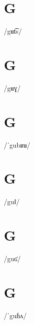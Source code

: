 \documentclass[10pt,a4paper,twoside]{book}
\begin{document}
\section*{G}

\begin{multicols}{3}
 {/gʉt͡s/} {}
\end{multicols}

\section*{G}

\begin{multicols}{3}
 {/gʉɣ/} {}
\end{multicols}

\section*{G}

\begin{multicols}{3}
 {/ˈgubʁʉ/} {}
\end{multicols}

\section*{G}

\begin{multicols}{3}
 {/guǁ/} {}
\end{multicols}

\section*{G}

\begin{multicols}{3}
 {/guʛ/} {}
\end{multicols}

\section*{G}

\begin{multicols}{3}
 {/ˈguɦʌ/} {}
\end{multicols}
\end{document}
